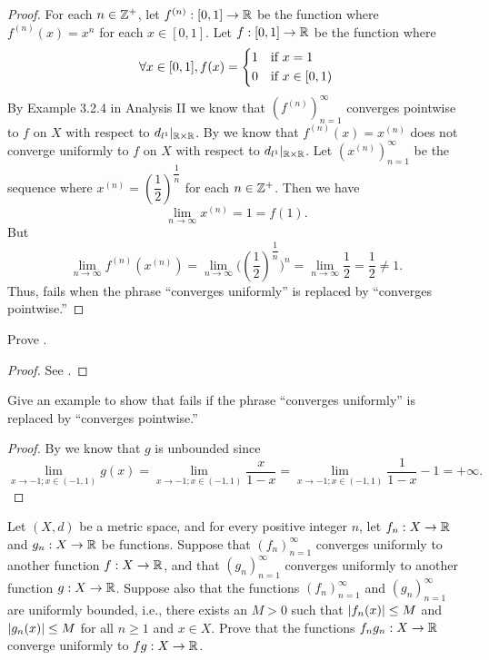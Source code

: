 \begin{proof}
  For each \(n \in \mathbb{Z}^+\), let \(f^{(n)} : [0, 1] \to \mathbb{R}\) be the function where \(f^{(n)}(x) = x^n\) for each \(x \in [0, 1]\).
  Let \(f : [0, 1] \to \mathbb{R}\) be the function where
  \[
    \forall x \in [0, 1], f(x) = \begin{dcases}
      1 & \text{if } x = 1        \\
      0 & \text{if } x \in [0, 1)
    \end{dcases}
  \]
  By Example 3.2.4 in Analysis II we know that \((f^{(n)})_{n = 1}^\infty\) converges pointwise to \(f\) on \(X\) with respect to \(d_{l^1}|_{\mathbb{R} \times \mathbb{R}}\).
  By  we know that \(f^{(n)}(x) = x^{(n)}\) does not converge uniformly to \(f\) on \(X\) with respect to \(d_{l^1}|_{\mathbb{R} \times \mathbb{R}}\).
  Let \((x^{(n)})_{n = 1}^\infty\) be the sequence where \(x^{(n)} = (\dfrac{1}{2})^{\dfrac{1}{n}}\) for each \(n \in \mathbb{Z}^+\).
  Then we have
  \[
    \lim_{n \to \infty} x^{(n)} = 1 = f(1).
  \]
  But
  \[
    \lim_{n \to \infty} f^{(n)}(x^{(n)}) = \lim_{n \to \infty} \big((\dfrac{1}{2})^{\dfrac{1}{n}}\big)^n = \lim_{n \to \infty} \dfrac{1}{2} = \dfrac{1}{2} \neq 1.
  \]
  Thus,  fails when the phrase ``converges uniformly'' is replaced by ``converges pointwise.''
\end{proof}

\begin{ex}\label{ii:ex:3.3.6}
  Prove .
\end{ex}

\begin{proof}
  See .
\end{proof}

\begin{ex}\label{ii:ex:3.3.7}
  Give an example to show that  fails if the phrase ``converges uniformly'' is replaced by ``converges pointwise.''
\end{ex}

\begin{proof}
  By  we know that \(g\) is unbounded since
  \[
    \lim_{x \to -1 ; x \in (-1, 1)} g(x) = \lim_{x \to -1 ; x \in (-1, 1)} \dfrac{x}{1 - x} = \lim_{x \to -1 ; x \in (-1, 1)} \dfrac{1}{1 - x} - 1 = +\infty.
  \]
\end{proof}

\begin{ex}\label{ii:ex:3.3.8}
  Let \((X, d)\) be a metric space, and for every positive integer \(n\), let \(f_n : X \to \mathbb{R}\) and \(g_n : X \to \mathbb{R}\) be functions.
  Suppose that \((f_n)_{n = 1}^\infty\) converges uniformly to another function \(f : X \to \mathbb{R}\), and that \((g_n)_{n = 1}^\infty\) converges uniformly to another function \(g : X \to \mathbb{R}\).
  Suppose also that the functions \((f_n)_{n = 1}^\infty\) and \((g_n)_{n = 1}^\infty\) are uniformly bounded, i.e., there exists an \(M > 0\) such that \(\left\lvert f_n(x)\right\rvert \leq M\) and \(\left\lvert g_n(x)\right\rvert \leq M\) for all \(n \geq 1\) and \(x \in X\).
  Prove that the functions \(f_n g_n : X \to \mathbb{R}\) converge uniformly to \(fg : X \to \mathbb{R}\).
\end{ex}


